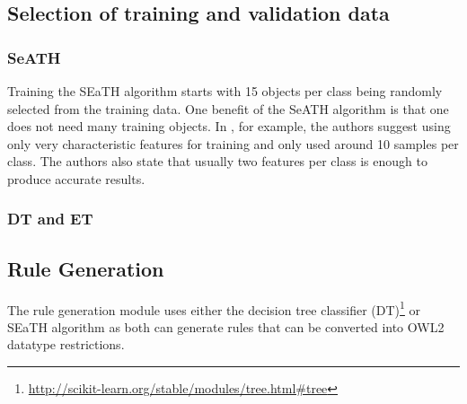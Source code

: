 \documentclass[authoryear, review,12pt,number]{elsarticle}
\begin{document}

\label{Selection_of_training_validation_data}
\subsection{Selection of training and validation data}
\subsubsection{SeATH}
Training the SEaTH algorithm %
starts with 15 
objects per class being randomly selected from the training data. One benefit of the SeATH algorithm is that one does not need many training
objects.
In \cite{Nussbaum2006}, for example, the authors suggest using only very
characteristic features for training and only used around 10 samples per
class. The authors also state that usually two features
per class is enough to produce accurate results.\\
\subsubsection{DT and ET}

\label{subsec_rulegen_data_mining}
\subsection{Rule Generation}
The %
rule generation module uses either the decision tree classifier 
(DT)\footnote{\url{http://scikit-learn.org/stable/modules/tree.html\#tree}} 
\citep{scikit-learn} or SEaTH algorithm \citep{Nussbaum2006} as both can 
generate rules that can be converted into OWL2 datatype restrictions. 
\end{document}
